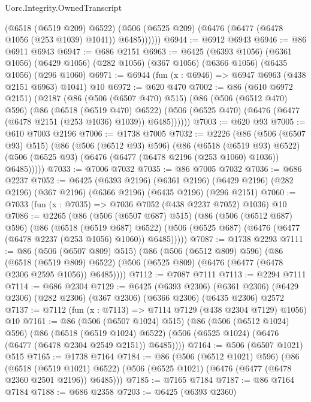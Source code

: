 \begin{lexlean}{Uorc.Integrity.OwnedTranscript}
\begin{coremodule}
            (@6518 (@6519 @209) @6522)
            (@506 (@6525 @209) (@6476 (@6477 (@6478 @1056 (@253 @1039) @1041)) @6485))))))
@6944 := @6912 @6943
@6946 := @86 @6911 @6943
@6947 := @686 @2151
@6963 := @6425
    (@6393 @1056)
    (@6361 @1056)
    (@6429 @1056)
    (@282 @1056)
    (@367 @1056)
    (@6366 @1056)
    (@6435 @1056)
    (@296 @1060)
@6971 := @6944 (fun (x : @6946) => @6947 @6963 (@438 @2151 @6963) @1041) @10
@6972 := @620 @470
@7002 := @86
    (@610 @6972 @2151)
    (@2187
      (@86
        (@506 (@6507 @470) @515)
        (@86
          (@506 (@6512 @470) @596)
          (@86
            (@6518 (@6519 @470) @6522)
            (@506 (@6525 @470) (@6476 (@6477 (@6478 @2151 (@253 @1036) @1039)) @6485))))))
@7003 := @620 @93
@7005 := @610 @7003 @2196
@7006 := @1738 @7005
@7032 := @2226
    (@86
      (@506 (@6507 @93) @515)
      (@86
        (@506 (@6512 @93) @596)
        (@86
          (@6518 (@6519 @93) @6522)
          (@506 (@6525 @93) (@6476 (@6477 (@6478 @2196 (@253 @1060) @1036)) @6485)))))
@7033 := @7006 @7032
@7035 := @86 @7005 @7032
@7036 := @686 @2237
@7052 := @6425
    (@6393 @2196)
    (@6361 @2196)
    (@6429 @2196)
    (@282 @2196)
    (@367 @2196)
    (@6366 @2196)
    (@6435 @2196)
    (@296 @2151)
@7060 := @7033 (fun (x : @7035) => @7036 @7052 (@438 @2237 @7052) @1036) @10
@7086 := @2265
    (@86
      (@506 (@6507 @687) @515)
      (@86
        (@506 (@6512 @687) @596)
        (@86
          (@6518 (@6519 @687) @6522)
          (@506 (@6525 @687) (@6476 (@6477 (@6478 @2237 (@253 @1056) @1060)) @6485)))))
@7087 := @1738 @2293
@7111 := @86
    (@506 (@6507 @809) @515)
    (@86
      (@506 (@6512 @809) @596)
      (@86
        (@6518 (@6519 @809) @6522)
        (@506 (@6525 @809) (@6476 (@6477 (@6478 @2306 @2595 @1056)) @6485))))
@7112 := @7087 @7111
@7113 := @2294 @7111
@7114 := @686 @2304
@7129 := @6425
    (@6393 @2306)
    (@6361 @2306)
    (@6429 @2306)
    (@282 @2306)
    (@367 @2306)
    (@6366 @2306)
    (@6435 @2306)
    @2572
@7137 := @7112 (fun (x : @7113) => @7114 @7129 (@438 @2304 @7129) @1056) @10
@7161 := @86
    (@506 (@6507 @1024) @515)
    (@86
      (@506 (@6512 @1024) @596)
      (@86
        (@6518 (@6519 @1024) @6522)
        (@506 (@6525 @1024) (@6476 (@6477 (@6478 @2304 @2549 @2151)) @6485))))
@7164 := @506 (@6507 @1021) @515
@7165 := @1738 @7164
@7184 := @86
    (@506 (@6512 @1021) @596)
    (@86
      (@6518 (@6519 @1021) @6522)
      (@506 (@6525 @1021) (@6476 (@6477 (@6478 @2360 @2501 @2196)) @6485)))
@7185 := @7165 @7184
@7187 := @86 @7164 @7184
@7188 := @686 @2358
@7203 := @6425
    (@6393 @2360)

\end{coremodule}
\end{lexlean}
